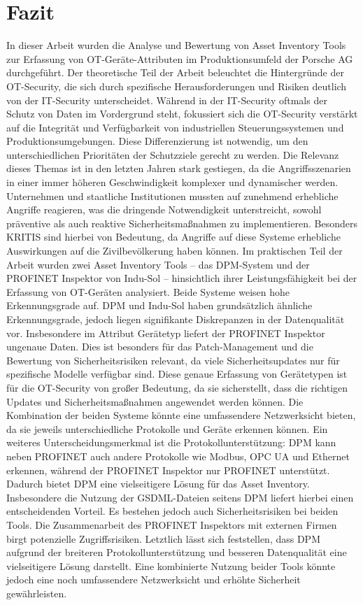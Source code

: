 \section{Fazit}

In dieser Arbeit wurden die Analyse und Bewertung von Asset Inventory Tools zur Erfassung von OT-Geräte-Attributen im Produktionsumfeld der Porsche AG durchgeführt. Der theoretische Teil der Arbeit beleuchtet die Hintergründe der OT-Security, die sich durch spezifische Herausforderungen und Risiken deutlich von der IT-Security unterscheidet. Während in der IT-Security oftmals der Schutz von Daten im Vordergrund steht, fokussiert sich die OT-Security verstärkt auf die Integrität und Verfügbarkeit von industriellen Steuerungssystemen und Produktionsumgebungen. Diese Differenzierung ist notwendig, um den unterschiedlichen Prioritäten der Schutzziele gerecht zu werden. Die Relevanz dieses Themas ist in den letzten Jahren stark gestiegen, da die Angriffsszenarien in einer immer höheren Geschwindigkeit komplexer und dynamischer werden. Unternehmen und staatliche Institutionen mussten auf zunehmend erhebliche Angriffe reagieren, was die dringende Notwendigkeit unterstreicht, sowohl präventive als auch reaktive Sicherheitsmaßnahmen zu implementieren. Besonders KRITIS sind hierbei von Bedeutung, da Angriffe auf diese Systeme erhebliche Auswirkungen auf die Zivilbevölkerung haben können. Im praktischen Teil der Arbeit wurden zwei Asset Inventory Tools – das DPM-System und der PROFINET Inspektor von Indu-Sol – hinsichtlich ihrer Leistungsfähigkeit bei der Erfassung von OT-Geräten analysiert. Beide Systeme weisen hohe Erkennungsgrade auf. DPM und Indu-Sol haben grundsätzlich ähnliche Erkennungsgrade, jedoch liegen signifikante Diskrepanzen in der Datenqualität vor. Insbesondere im Attribut Gerätetyp liefert der PROFINET Inspektor ungenaue Daten. Dies ist besonders für das Patch-Management und die Bewertung von Sicherheitsrisiken relevant, da viele Sicherheitsupdates nur für spezifische Modelle verfügbar sind. Diese genaue Erfassung von Gerätetypen ist für die OT-Security von großer Bedeutung, da sie sicherstellt, dass die richtigen Updates und Sicherheitsmaßnahmen angewendet werden können. Die Kombination der beiden Systeme könnte eine umfassendere Netzwerksicht bieten, da sie jeweils unterschiedliche Protokolle und Geräte erkennen können. Ein weiteres Unterscheidungsmerkmal ist die Protokollunterstützung: DPM kann neben PROFINET auch andere Protokolle wie Modbus, OPC UA und Ethernet erkennen, während der PROFINET Inspektor nur PROFINET unterstützt. Dadurch bietet DPM eine vielseitigere Lösung für das Asset Inventory. Insbesondere die Nutzung der GSDML-Dateien seitens DPM liefert hierbei einen entscheidenden Vorteil. Es bestehen jedoch auch Sicherheitsrisiken bei beiden Tools. Die Zusammenarbeit des PROFINET Inspektors mit externen Firmen birgt potenzielle Zugriffsrisiken. 
Letztlich lässt sich feststellen, dass DPM aufgrund der breiteren Protokollunterstützung und besseren Datenqualität eine vielseitigere Lösung darstellt. Eine kombinierte Nutzung beider Tools könnte jedoch eine noch umfassendere Netzwerksicht und erhöhte Sicherheit gewährleisten.
